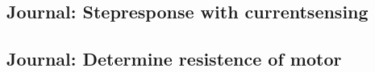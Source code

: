 \documentclass[../../main]{subfiles}
\begin{document}
\subsection{Journal: Stepresponse with currentsensing}%
\label{sub:journal_stepresponse_with_currentsensing}

\subsection{Journal: Determine resistence of motor}%
\label{sub:journal_determine_resistence_of_motor}

\end{document}
